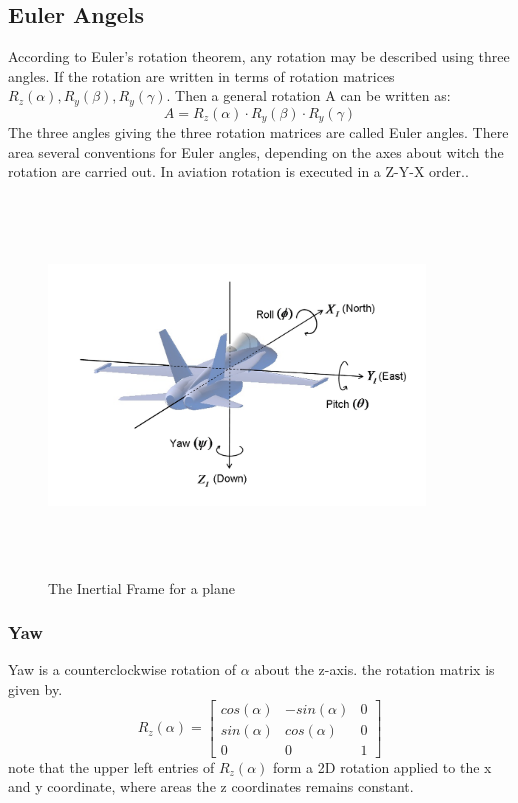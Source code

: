 \subsection{Euler Angels}
According to Euler's rotation theorem, any rotation may be described using three angles. If  the rotation are written in terms of rotation matrices $R_{z}(\alpha),R_{y}(\beta),R_{y}(\gamma)$. Then a general rotation A can be written as:
\begin{equation}
A = R_{z}(\alpha)\cdot R_{y}(\beta)\cdot R_{y}(\gamma)
\end{equation}
The three angles giving the three rotation matrices are called Euler angles. There area several conventions for Euler angles, depending on the axes about witch the rotation are carried out. In aviation rotation is executed in a Z-Y-X order.\cite{Euler}.
\begin{figure}[H]
\centering
\includegraphics[width=10cm,height=10cm,keepaspectratio]{imagenes/Euler_Angles.png}
\caption{The Inertial Frame for a plane}
\label{fig:Euler}
\end{figure}
\subsubsection{Yaw}
Yaw is a counterclockwise rotation of $\alpha$ about the z-axis. the rotation matrix is given by.
\begin{equation}R_{z}(\alpha) =
\begin{bmatrix}cos(\alpha) & -sin(\alpha) & 0 \\sin(\alpha) & cos(\alpha)& 0\\0 &0&1 \end{bmatrix}
\end{equation}
note that the upper left entries of $R_{z}(\alpha)$ form a 2D rotation applied to the x and y coordinate, where areas the z coordinates remains constant.\cite{Euler_angles}
